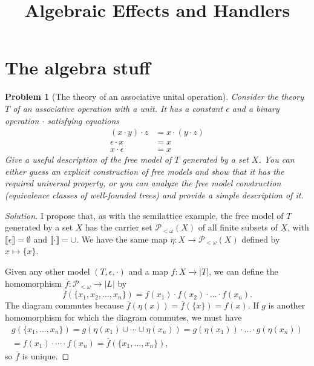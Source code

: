 \documentclass[12pt]{article}
\title{Algebraic Effects and Handlers}
\author{}
\date{}
\newtheorem{problem}{Problem}[section]}
\begin{document}
    \maketitle

    \section{The algebra stuff}
    \begin{problem}[The theory of an associative unital operation]
        Consider the theory $T$ of an associative operation with a unit.
        It has a constant $\epsilon$ and a binary operation $\cdot$
        satisfying equations
        \begin{align*}
            (x \cdot y) \cdot z &= x \cdot (y \cdot z) \\
            \epsilon \cdot x &= x \\
            x \cdot \epsilon &= x
        \end{align*}
        Give a useful description of the free model of $T$ generated by a
        set $X$. You can either guess an explicit construction of free
        models and show that it has the required universal property, or you can
        analyze the free model construction (equivalence classes of well-founded
        trees) and provide a simple description of it.
    \end{problem}
    \begin{proof}[Solution]
        I propose that, as with the semilattice example, the free model of $T$
        generated by a set $X$ has the carrier set $\mathcal{P}_{<\omega}(X)$ of
        all finite subsets of $X$, with $\llbracket\epsilon\rrbracket=\emptyset$
        and $\llbracket\cdot\rrbracket=\cup$. We have the same map $\eta : X\rightarrow
        \mathcal{P}_{<\omega}(X)$ defined by $x\mapsto \{x\}$.

        Given any other model $(T,\epsilon,\cdot)$ and a map $f : X\rightarrow
        |T|$, we can define the homomorphism $\overline{f}:
        \mathcal{P}_{<\omega}\rightarrow |L|$ by
        \[
            \overline{f}(\{x_1,x_2,\dots,x_n\})=f(x_1)\cdot f(x_2)\cdot \dots
            \cdot f(x_n).
        \]
        The diagram commutes because
        $\overline{f}(\eta(x))=\overline{f}(\{x\})=f(x)$. If $g$ is another
        homomorphism for which the diagram commutes, we must have
        \begin{align*}
            g(\{x_1,\dots,x_n\})=g(\eta(x_1)\cup\cdots\cup\eta(x_n))=g(\eta(x_1))\cdot\dots\cdot
            g(\eta(x_n)) \\
            = f(x_1)\cdot\cdots\cdot f(x_n)=\overline{f}(\{x_1,\dots,x_n\}),
        \end{align*}
        so $\overline{f}$ is unique.
    \end{proof}
\end{document}
